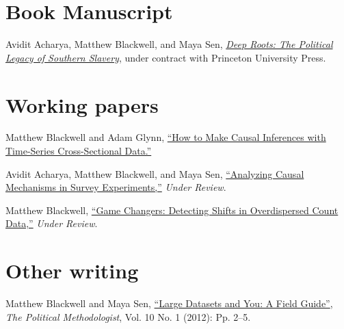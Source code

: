 \documentclass[margin,line,12pt]{res}
\newenvironment{list1}{
  \begin{list}{\ding{113}}{%
      \setlength{\itemsep}{0in}
      \setlength{\parsep}{0in} \setlength{\parskip}{0in}
      \setlength{\topsep}{0in} \setlength{\partopsep}{0in} 
      \setlength{\leftmargin}{0.83 cm}}}{\end{list}}
\begin{document}
\begin{resume}
\section{\sc Book Manuscript}

Avidit Acharya, Matthew Blackwell, and Maya Sen, \href{http://www.mattblackwell.org/slavery-book/}{\emph{Deep Roots: The Political Legacy of Southern Slavery}}, under contract with Princeton University Press.

\section{\sc Working papers}

Matthew Blackwell and Adam Glynn, \href{http://www.mattblackwell.org/files/papers/causal-tscs.pdf}{``How to Make Causal Inferences with Time-Series
  Cross-Sectional Data.''}


Avidit Acharya, Matthew Blackwell, and Maya Sen, \href{http://www.mattblackwell.org/files/papers/survey-experiments.pdf}{``Analyzing Causal Mechanisms in Survey Experiments,''} \emph{Under Review}.


Matthew Blackwell, \href{http://www.mattblackwell.org/files/papers/gamechangers.pdf}{``Game Changers: Detecting Shifts in Overdispersed Count Data,''} \emph{Under Review}.




\section{\sc Other writing}

Matthew Blackwell and Maya Sen, 
\href{http://polmeth.wustl.edu/methodologist/tpm_v20_n1.pdf}{``Large
  Datasets and You: A Field Guide''}, \emph{The Political
  Methodologist}, Vol. 10 No. 1 (2012): Pp. 2--5.


\end{resume}
\end{document}
